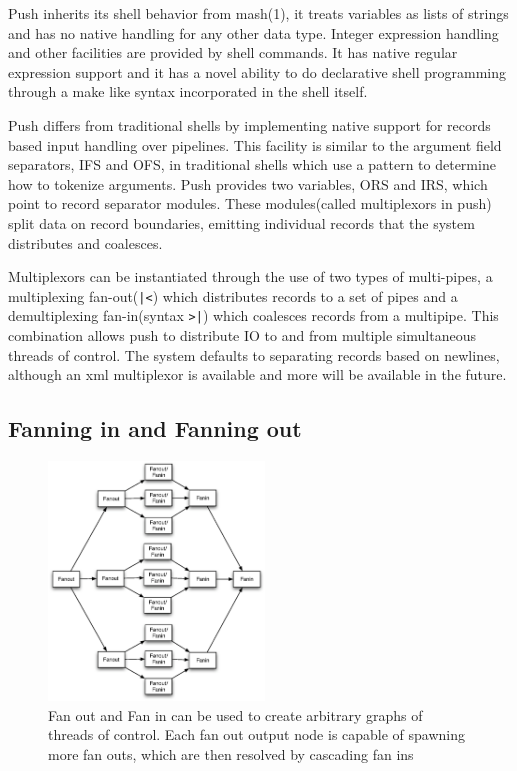 \documentclass[11pt, letterpaper]{article}
\begin{document}
Push inherits its shell behavior from mash(1), it treats variables as lists of strings and has no native handling for any other data type. Integer expression handling and other facilities are provided by shell commands. It has native regular expression support and it has a novel ability to do declarative shell programming through a make like syntax incorporated in the shell itself.

Push differs from traditional shells by implementing native support for records based input handling over pipelines. This facility is similar to the argument field separators, IFS and OFS, in traditional shells which use a pattern to determine how to tokenize arguments. Push provides two variables, ORS and IRS, which point to record separator modules. These modules(called multiplexors in push) split data on record boundaries,  emitting individual records that the system distributes and coalesces. 

Multiplexors can be instantiated through the use of two types of multi-pipes, a multiplexing fan-out(\verb!|<!)  which distributes records to a set of pipes and a demultiplexing fan-in(syntax \verb!>|!) which coalesces records from a multipipe. This combination allows push to distribute IO to and from multiple simultaneous threads of control. The system defaults to separating records based on newlines, although an xml multiplexor is available and more will be available in the future. 
\subsection{Fanning in and Fanning out}

\begin{figure}[htp]
\centering
\includegraphics[height=2.5in]{fofigraph.eps}
\caption{Fan out and Fan in can be used to create arbitrary graphs of threads of control. Each fan out output node is capable of spawning more fan outs, which are then resolved by cascading fan ins}\label{fig:fofigraph}
\end{figure}
\end{document}
